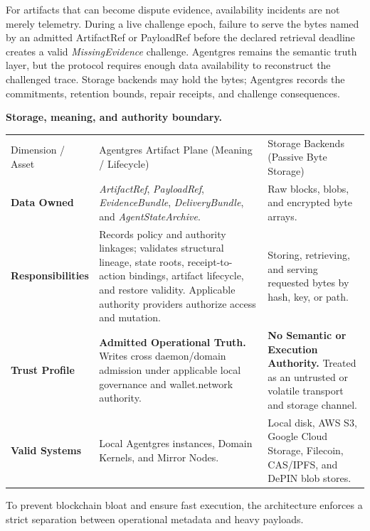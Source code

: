\documentclass[
  11pt,
]{article}
\begin{document}
For artifacts that can become dispute evidence, availability incidents
are not merely telemetry. During a live challenge epoch, failure to serve
the bytes named by an admitted ArtifactRef or PayloadRef before the
declared retrieval deadline creates a valid \emph{MissingEvidence}
challenge. Agentgres remains the semantic truth layer, but the protocol
requires enough data availability to reconstruct the challenged trace.
Storage backends may hold the bytes; Agentgres records the commitments,
retention bounds, repair receipts, and challenge consequences.

\textbf{Storage, meaning, and authority boundary.}

\begin{longtable}[]{@{}
  >{\raggedright\arraybackslash}p{}
  >{\raggedright\arraybackslash}p{}
  >{\raggedright\arraybackslash}p{}@{}}
\toprule\noalign{}
& & \\
\midrule\noalign{}
\endhead
\bottomrule\noalign{}
\endlastfoot
Dimension / Asset & Agentgres Artifact Plane (Meaning / Lifecycle) & Storage
Backends (Passive Byte Storage) \\
\textbf{Data Owned} & \emph{ArtifactRef}, \emph{PayloadRef},
\emph{EvidenceBundle}, \emph{DeliveryBundle}, and
\emph{AgentStateArchive}. & Raw blocks, blobs, and encrypted byte
arrays. \\
\textbf{Responsibilities} & Records policy and authority linkages;
validates structural lineage, state roots, receipt-to-action bindings,
artifact lifecycle, and restore validity. Applicable authority providers
authorize access and mutation. & Storing, retrieving, and serving requested
bytes by hash, key, or path. \\
\textbf{Trust Profile} & \textbf{Admitted Operational Truth.} Writes
cross daemon/domain admission under applicable local governance and
wallet.network authority. & \textbf{No Semantic or Execution Authority.}
Treated as an untrusted or volatile transport and storage channel. \\
\textbf{Valid Systems} & Local Agentgres instances, Domain Kernels, and
Mirror Nodes. & Local disk, AWS S3, Google Cloud Storage, Filecoin,
CAS/IPFS, and DePIN blob stores. \\
\end{longtable}

To prevent blockchain bloat and ensure fast execution, the architecture
enforces a strict separation between operational metadata and heavy
payloads.
\end{document}
